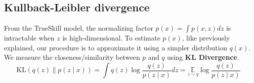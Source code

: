 \subsection{Kullback-Leibler divergence}
From the TrueSkill model, the normalizing factor $p(x)=\int p(x,z)dz$ is intractable when $z$ is high-dimensional. To estimate $p(x)$, like previously explained, our procedure is to approximate it using a simpler distribution $q(x)$. We measure the closeness/similarity between $p$ and $q$ using \textbf{KL Divergence}.
$$\mathrm{KL}(q(z) \| p(z \mid x))=\int q(z) \log \frac{q(z)}{p(z \mid x)} d z=\underset{z \sim q}{\mathbb{E}} \log \frac{q(z)}{p(z \mid x)}$$